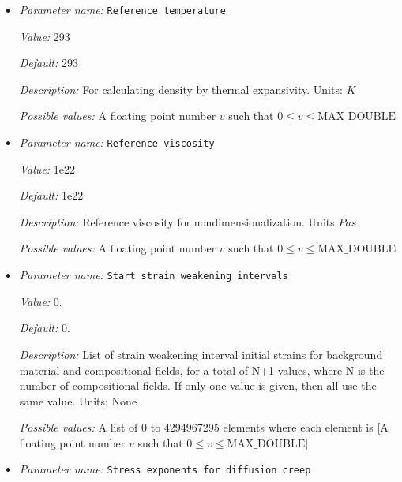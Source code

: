 \begin{itemize}
{\it Default:} 1.0e-15


{\it Description:} Reference strain rate for first time step. Units: $1 / s$


{\it Possible values:} A floating point number $v$ such that $0 \leq v \leq \text{MAX\_DOUBLE}$
\item {\it Parameter name:} {\tt Reference temperature}
\label{parameters:Material model/Visco Plastic/Reference temperature}


{\it Value:} 293


{\it Default:} 293


{\it Description:} For calculating density by thermal expansivity. Units: $K$


{\it Possible values:} A floating point number $v$ such that $0 \leq v \leq \text{MAX\_DOUBLE}$
\item {\it Parameter name:} {\tt Reference viscosity}
\label{parameters:Material model/Visco Plastic/Reference viscosity}


{\it Value:} 1e22


{\it Default:} 1e22


{\it Description:} Reference viscosity for nondimensionalization. Units $Pa s$


{\it Possible values:} A floating point number $v$ such that $0 \leq v \leq \text{MAX\_DOUBLE}$
\item {\it Parameter name:} {\tt Start strain weakening intervals}
\label{parameters:Material model/Visco Plastic/Start strain weakening intervals}


{\it Value:} 0.


{\it Default:} 0.


{\it Description:} List of strain weakening interval initial strains for background material and compositional fields, for a total of N+1 values, where N is the number of compositional fields. If only one value is given, then all use the same value.  Units: None


{\it Possible values:} A list of 0 to 4294967295 elements where each element is [A floating point number $v$ such that $0 \leq v \leq \text{MAX\_DOUBLE}$]
\item {\it Parameter name:} {\tt Stress exponents for diffusion creep}
\label{parameters:Material model/Visco Plastic/Stress exponents for diffusion creep}



\end{itemize}
